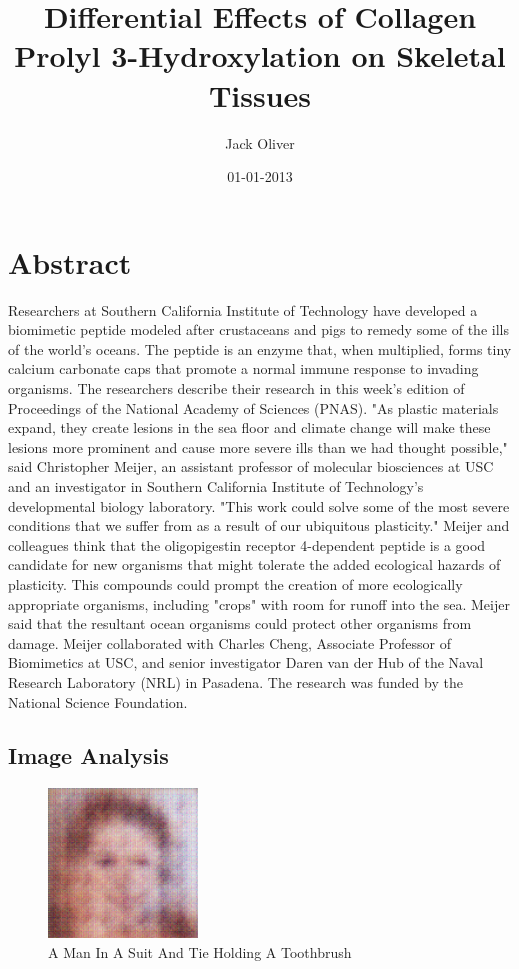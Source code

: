\documentclass{article}%
\title{Differential Effects of Collagen Prolyl 3{-}Hydroxylation on Skeletal Tissues}%
\author{Jack Oliver}%
\affil{Laboratory of Tumor Biology, Angiogenesis and Nanomedicine Research, National Center for Cell Science, Pune, India}%
\date{01{-}01{-}2013}%
\begin{document}
%
\normalsize%
\maketitle%
\section{Abstract}%
\label{sec:Abstract}%
Researchers at Southern California Institute of Technology have developed a biomimetic peptide modeled after crustaceans and pigs to remedy some of the ills of the world's oceans. The peptide is an enzyme that, when multiplied, forms tiny calcium carbonate caps that promote a normal immune response to invading organisms.\newline%
The researchers describe their research in this week's edition of Proceedings of the National Academy of Sciences (PNAS).\newline%
"As plastic materials expand, they create lesions in the sea floor and climate change will make these lesions more prominent and cause more severe ills than we had thought possible," said Christopher Meijer, an assistant professor of molecular biosciences at USC and an investigator in Southern California Institute of Technology's developmental biology laboratory. "This work could solve some of the most severe conditions that we suffer from as a result of our ubiquitous plasticity."\newline%
Meijer and colleagues think that the oligopigestin receptor 4{-}dependent peptide is a good candidate for new organisms that might tolerate the added ecological hazards of plasticity. This compounds could prompt the creation of more ecologically appropriate organisms, including "crops" with room for runoff into the sea. Meijer said that the resultant ocean organisms could protect other organisms from damage.\newline%
Meijer collaborated with Charles Cheng, Associate Professor of Biomimetics at USC, and senior investigator Daren van der Hub of the Naval Research Laboratory (NRL) in Pasadena. The research was funded by the National Science Foundation.

%
\subsection{Image Analysis}%
\label{subsec:ImageAnalysis}%


\begin{figure}[h!]%
\centering%
\includegraphics[width=150px]{500_fake_images/samples_5_166.png}%
\caption{A Man In A Suit And Tie Holding A Toothbrush}%
\end{figure}

%
\end{document}
